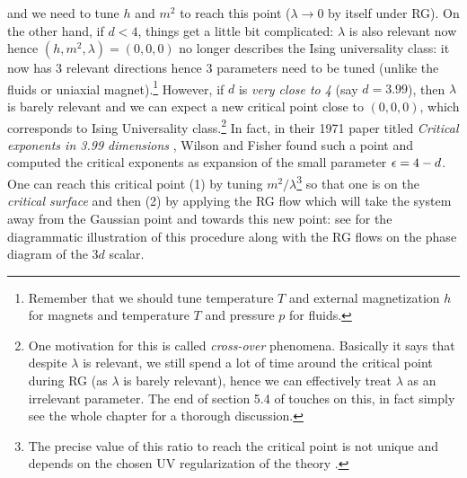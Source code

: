\documentclass[12pt]{article}
\numberwithin{equation}{section}
\begin{document}
and we need to tune $h$ and $m^2$ to reach this point ($\lambda\rightarrow 0$ by itself under RG). On the other hand, if $d<4$, things get a little bit complicated: $\lambda$ is also relevant now hence $(h,m^2,\lambda)=(0,0,0)$ no longer describes the Ising universality class: it now has 3 relevant directions hence 3 parameters need to be tuned (unlike the fluids or uniaxial magnet).\footnote{Remember that we should tune temperature $T$ and external magnetization $h$ for magnets and temperature $T$ and pressure $p$ for fluids.} However, if $d$ is \emph{very close to 4} (say $d=3.99$), then $\lambda$ is barely relevant and we can expect a new critical point close to $(0,0,0)$, which corresponds to Ising Universality class.\footnote{One motivation for this is called \emph{cross-over} phenomena. Basically it says that despite $\lambda$ is relevant, we still spend a lot of time around the critical point during RG (as $\lambda$ is barely relevant), hence we can effectively treat $\lambda$ as an irrelevant parameter. The end of section 5.4 of \cite{Cardy:1996xt} touches on this, in fact simply see the whole chapter for a thorough discussion.} In fact, in their 1971 paper titled \emph{Critical exponents in 3.99 dimensions} \cite{Wilson:1971dc}, Wilson and Fisher found such a point and computed the critical exponents as expansion of the small parameter $\epsilon=4-d$. One can reach this critical point (1) by tuning $m^2/\lambda$\footnote{The precise value of this ratio to reach the critical point is not unique and depends on the chosen UV regularization of the theory \cite{Simmons-Duffin:2016gjk}.} so that one is on the \emph{critical surface} and then (2) by applying the RG flow which will take the system away from the Gaussian point and towards this new point: see \figref{\ref{fig: Wilson-fisher}} for the diagrammatic illustration of this procedure along with the RG flows on the phase diagram of the $3d$ scalar.
\end{document}
